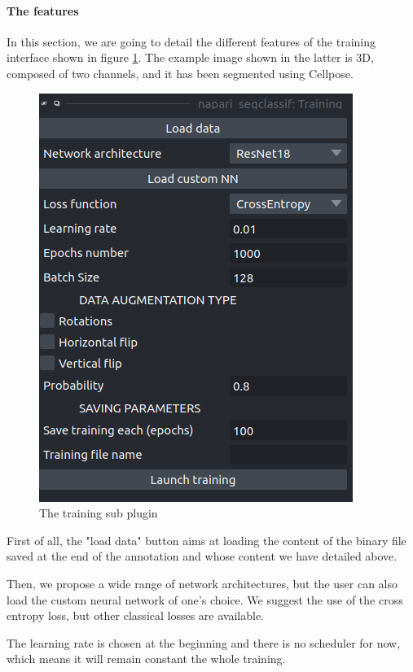 \documentclass{article}
\begin{document}
\paragraph*{The features}

In this section, we are going to detail the different features of the training interface shown in figure \ref{training}. The example image shown in the latter is 3D, composed of two channels, and it has been segmented using Cellpose\cite{stringer2021cellpose}.
\begin{figure}[htp!]{}
 \centering
 \includegraphics[scale=0.15]{Figures/training.png}
  \caption{The training sub plugin}
  \label{training}
\end{figure}


First of all, the "load data" button aims at loading the content of the binary file saved at the end of the annotation and whose content we have detailed above.

Then, we propose a wide range of network architectures, but the user can also load the custom neural network of one's choice. We suggest the use of the cross entropy loss, but other classical losses are available. 

The learning rate is chosen at the beginning and there is no scheduler for now, which means it will remain constant the whole training. 
\end{document}
